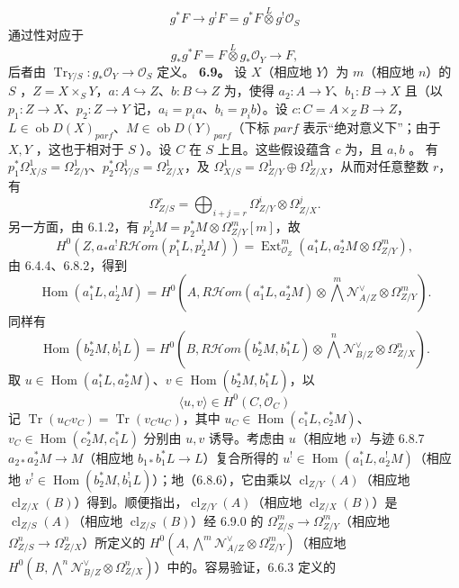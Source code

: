 \[g^*F\longrightarrow g^!F=g^*F\mathbin{\overset L\otimes}g^!\mathcal O_S\tag{6.8.6}\]
通过性对应于
\[g_*g^*F=F\mathbin{\overset L\otimes}g_*\mathcal O_Y\longrightarrow F,\tag{6.8.7}\]
后者由 $\operatorname{Tr}_{Y/S}:g_*\mathcal O_Y\to\mathcal O_S$ 定义。
\textbf{6.9。} 设 $X$（相应地 $Y$）为 $m$（相应地 $n$）的 $S$ ，$Z=X\times_SY$，$a:A\hookrightarrow Z$、$b:B\hookrightarrow Z$ 为，使得 $a_2:A\to Y$、$b_1:B\to X$ 且（以 $p_1:Z\to X$、$p_2:Z\to Y$ 记，$a_i=p_ia$、$b_i=p_ib$）。设 $c:C=A\times_ZB\to Z$，$L\in\operatorname{ob}D(X)_{parf}$、$M\in\operatorname{ob}D(Y)_{parf}$（下标 $parf$ 表示“绝对意义下”；由于 $X,Y$ ，这也于相对于 $S$ ）。设 $C$ 在 $S$ 上且。这些假设蕴含 $c$ 为，且 $a,b$ 。
有 $p_1^*\Omega^1_{X/S}=\Omega^1_{Z/Y}$、$p_2^*\Omega^1_{Y/S}=\Omega^1_{Z/X}$，及 $\Omega^1_{X/S}=\Omega^1_{Z/Y}\oplus\Omega^1_{Z/X}$，从而对任意整数 $r$，有
\[\Omega^r_{Z/S}=\bigoplus_{i+j=r}\Omega^i_{Z/Y}\otimes\Omega^j_{Z/X}.\tag{6.9.0}\]
另一方面，由 6.1.2，有 $p_2^!M=p_2^*M\otimes\Omega^m_{Z/Y}[m]$，故
\[H^0(Z,a_*a^!R\mathcal Hom(p_1^*L,p_2^!M))=\operatorname{Ext}_{\mathcal O_Z}^m(a_1^*L,a_2^*M\otimes\Omega^m_{Z/Y}),\]
由 6.4.4、6.8.2，得到
\[\operatorname{Hom}(a_1^*L,a_2^!M)=H^0(A,R\mathcal Hom(a_1^*L,a_2^*M)\otimes\bigwedge^m\mathcal N_{A/Z}^{\vee}\otimes\Omega^m_{Z/Y}).\tag{6.9.1}\]
同样有
\[\operatorname{Hom}(b_2^*M,b_1^!L)=H^0(B,R\mathcal Hom(b_2^*M,b_1^*L)\otimes\bigwedge^n\mathcal N_{B/Z}^{\vee}\otimes\Omega^n_{Z/X}).\tag{6.9.2}\]
取 $u\in\operatorname{Hom}(a_1^*L,a_2^*M)$、$v\in\operatorname{Hom}(b_2^*M,b_1^*L)$，以
\[\langle u,v\rangle\in H^0(C,\mathcal O_C)\tag{6.9.3}\]
记 $\operatorname{Tr}(u_Cv_C)=\operatorname{Tr}(v_Cu_C)$，其中 $u_C\in\operatorname{Hom}(c_1^*L,c_2^*M)$、$v_C\in\operatorname{Hom}(c_2^*M,c_1^*L)$ 分别由 $u,v$ 诱导。考虑由 $u$（相应地 $v$）与迹 6.8.7 $a_{2*}a_2^*M\to M$（相应地 $b_{1*}b_1^*L\to L$）复合所得的 $u^!\in\operatorname{Hom}(a_1^*L,a_2^!M)$（相应地 $v^!\in\operatorname{Hom}(b_2^*M,b_1^!L)$）；地（6.8.6），它由乘以 $\operatorname{cl}_{Z/Y}(A)$（相应地 $\operatorname{cl}_{Z/X}(B)$）得到。顺便指出，$\operatorname{cl}_{Z/Y}(A)$（相应地 $\operatorname{cl}_{Z/X}(B)$）是 $\operatorname{cl}_{Z/S}(A)$（相应地 $\operatorname{cl}_{Z/S}(B)$）经 6.9.0 的 $\Omega^m_{Z/S}\to\Omega^m_{Z/Y}$（相应地 $\Omega^n_{Z/S}\to\Omega^n_{Z/X}$）所定义的 $H^0(A,\bigwedge^m\mathcal N_{A/Z}^{\vee}\otimes\Omega^m_{Z/Y})$（相应地 $H^0(B,\bigwedge^n\mathcal N_{B/Z}^{\vee}\otimes\Omega^n_{Z/X})$）中的。容易验证，6.6.3 定义的
